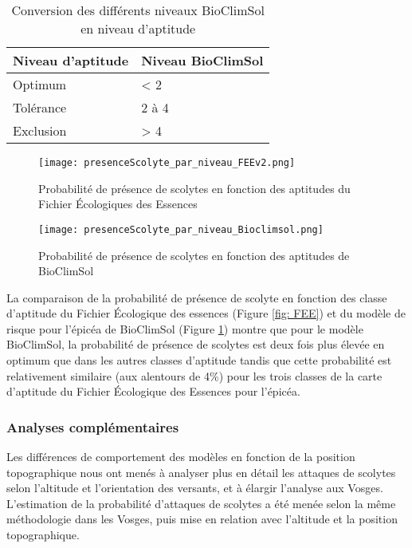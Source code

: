 \begin{table}[htbp]
	\caption{Conversion des différents niveaux BioClimSol en niveau d'aptitude}
	\label{tab: level}
	\begin{tabular}{|l|l|}
		\hline
		Niveau d'aptitude & Niveau BioClimSol \\ \hline
		Optimum           & < 2            \\ \hline
		Tolérance         & 2 à 4          \\ \hline
		
		Exclusion         &  > 4   \\ \hline
	\end{tabular}
	
\end{table}
\begin{figure}[htbp]
	\begin{minipage}[b]{1 \linewidth}
		\centering
		\texttt{[image: presenceScolyte\_par\_niveau\_FEEv2.png]}
		\caption{Probabilité de présence de scolytes en fonction des aptitudes du Fichier Écologiques des Essences }
		\label{fig: FEE}
		
	\end{minipage}\hfill
	\vspace{2cm}
	\begin{minipage}[b]{1 \linewidth}
		\centering
		\texttt{[image: presenceScolyte\_par\_niveau\_Bioclimsol.png]}
		\caption{Probabilité de présence de scolytes en fonction des aptitudes de BioClimSol}
		\label{fig: apt_2}
	\end{minipage}
\end{figure}

La comparaison de la probabilité de présence de scolyte en fonction des classe d’aptitude du Fichier Écologique des essences (Figure \ref{fig: FEE}) et du modèle de risque pour l'épicéa de BioClimSol (Figure \ref{fig: apt_2}) montre que pour le modèle BioClimSol, la probabilité de présence de scolytes est deux fois plus élevée en optimum que dans les autres classes d’aptitude tandis que cette probabilité est relativement similaire (aux alentours de 4\%) pour les trois classes de la carte d'aptitude du Fichier Écologique des Essences pour l'épicéa.

\subsubsection{Analyses complémentaires}
Les différences de comportement des modèles en fonction de la position topographique nous ont menés à analyser plus en détail les attaques de scolytes selon l'altitude et l'orientation des versants, et à élargir l'analyse aux Vosges. L'estimation de la probabilité d'attaques de scolytes a été menée selon la même méthodologie dans les Vosges, puis mise en relation avec l'altitude et la position topographique.\\

